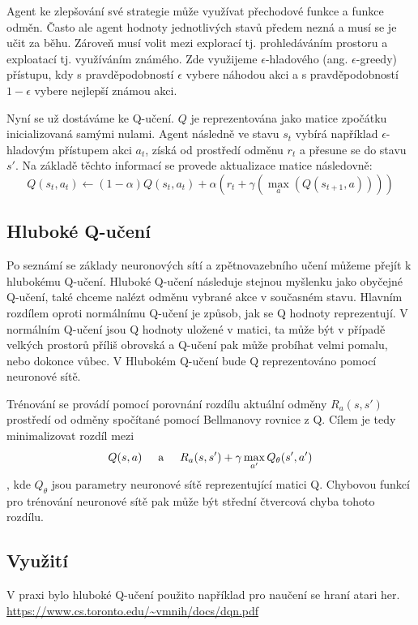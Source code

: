Agent ke zlepšování své strategie může využívat přechodové funkce a funkce odměn. Často ale agent hodnoty jednotlivých stavů předem nezná a musí se je učit za běhu.
Zároveň musí volit mezi explorací tj. prohledáváním prostoru a exploatací tj. využíváním známého. Zde využijeme $\epsilon$-hladového (ang. $\epsilon$-greedy) přístupu, kdy s pravděpodobností $\epsilon$ vybere náhodou akci a s pravděpodobností $1-\epsilon$ vybere nejlepší známou akci.

Nyní se už dostáváme ke Q-učení. $Q$ je reprezentována jako matice zpočátku inicializovaná samými nulami. Agent následně ve stavu $s_t$ vybírá například $\epsilon$-hladovým přístupem akci $a_t$, získá od prostředí odměnu $r_t$ a přesune se do stavu $s'$.
Na základě těchto informací se provede aktualizace matice následovně:
\newline
\[Q(s_t,a_t) \leftarrow (1-\alpha)Q(s_t,a_t) + \alpha(r_t + \gamma(\max_a(Q(s_{t+1},a))))\]




\subsection{Hluboké Q-učení}
Po seznámí se základy neuronových sítí a zpětnovazebního učení můžeme přejít k hlubokému Q-učení.
Hluboké Q-učení následuje stejnou myšlenku jako obyčejné Q-učení, také chceme nalézt odměnu vybrané akce v současném stavu.
Hlavním rozdílem oproti normálnímu Q-učení je způsob, jak se Q hodnoty reprezentují. V normálním Q-učení jsou Q hodnoty uložené v matici, ta může být v případě velkých prostorů příliš obrovská a Q-učení pak může probíhat velmi pomalu, nebo dokonce vůbec.
V Hlubokém Q-učení bude Q reprezentováno pomocí neuronové sítě.

Trénování se provádí pomocí porovnání rozdílu aktuální odměny $R_a(s,s')$ prostředí od odměny spočítané pomocí Bellmanovy rovnice z Q.
Cílem je tedy minimalizovat rozdíl mezi \[Q(s,a) \hspace{5mm}\text{a}\hspace{5mm}  R_a(s,s') + \gamma\max_{a'}Q_{\theta}(s',a')\], kde $Q_{\theta}$ jsou parametry neuronové sítě reprezentující matici Q.
Chybovou funkcí pro trénování neuronové sítě pak může být střední čtvercová chyba tohoto rozdílu.



\subsection{Využití}
V praxi bylo hluboké Q-učení použito například pro naučení se hraní atari her. 
\url{https://www.cs.toronto.edu/~vmnih/docs/dqn.pdf}

